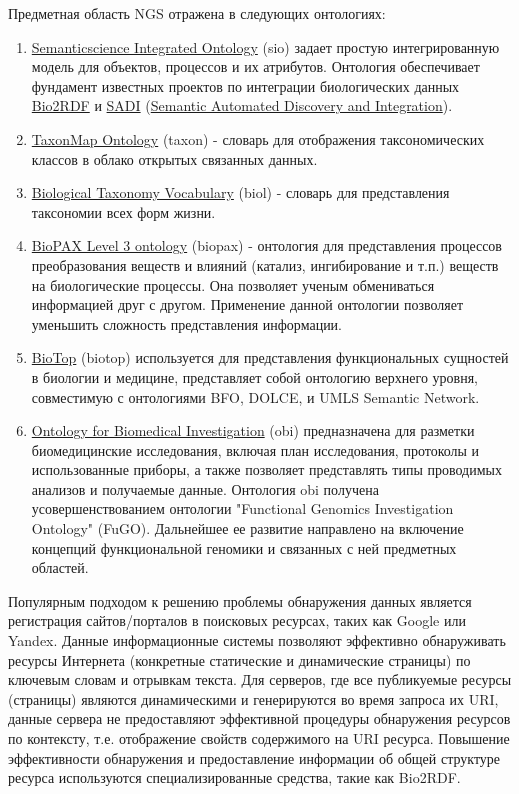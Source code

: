 \documentclass[a4paper,12pt,openany,final]{extreport}
\begin{document}
Предметная область NGS отражена в следующих онтологиях:

\begin{enumerate}
\def\labelenumi{\arabic{enumi}.}
\item
  \href{https://github.com/micheldumontier/semanticscience}{{Semanticscience
  Integrated Ontology}} (sio) задает простую интегрированную модель для
  объектов, процессов и их атрибутов. Онтология обеспечивает фундамент
  известных проектов по интеграции биологических данных
  \href{http://bio2rdf.org}{{Bio2RDF}} и
  \href{http://sadiframework.org}{{SADI}}
  (\href{http://sadiframework.org/content/about-sadi/}{{Semantic
  Automated Discovery and Integration}}).
\item
  \href{http://purl.org/biodiversity/taxon/}{{TaxonMap Ontology}}
  (taxon) - словарь для отображения таксономических классов в облако
  открытых связанных данных.
\item
  \href{http://purl.org/NET/biol/ns}{{Biological Taxonomy Vocabulary}}
  (biol) - словарь для представления таксономии всех форм жизни.
\item
  \href{http://www.biopax.org/}{{BioPAX Level 3 ontology}} (biopax) -
  онтология для представления процессов преобразования веществ и влияний
  (катализ, ингибирование и т.п.) веществ на биологические процессы. Она
  позволяет ученым обмениваться информацией друг с другом. Применение
  данной онтологии позволяет уменьшить сложность представления
  информации.
\item
  \href{http://biotopontology.github.io/}{{BioTop}} (biotop)
  используется для представления функциональных сущностей в биологии и
  медицине, представляет собой онтологию верхнего уровня, совместимую с
  онтологиями BFO, DOLCE, и UMLS Semantic Network.
\item
  \href{https://raw.githubusercontent.com/obi-ontology/obi/v2017-09-03/obi.owl}{{Ontology
  for Biomedical Investigation}} (obi) предназначена для разметки
  биомедицинские исследования, включая план исследования, протоколы и
  использованные приборы, а также позволяет представлять типы проводимых
  анализов и получаемые данные. Онтология obi получена
  усовершенствованием онтологии "Functional Genomics Investigation
  Ontology" (FuGO). Дальнейшее ее развитие направлено на включение
  концепций функциональной геномики и связанных с ней предметных
  областей.
\end{enumerate}

Популярным подходом к решению проблемы обнаружения данных является
регистрация сайтов/порталов в поисковых ресурсах, таких как Google или
Yandex. Данные информационные системы позволяют эффективно обнаруживать
ресурсы Интернета (конкретные статические и динамические страницы) по
ключевым словам и отрывкам текста. Для серверов, где все публикуемые
ресурсы (страницы) являются динамическими и генерируются во время
запроса их URI, данные сервера не предоставляют эффективной процедуры
обнаружения ресурсов по контексту, т.е. отображение свойств содержимого
на URI ресурса. Повышение эффективности обнаружения и предоставление
информации об общей структуре ресурса используются специализированные
средства, такие как Bio2RDF.
\end{document}
